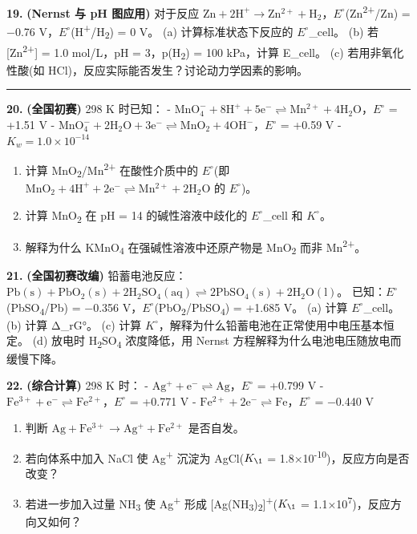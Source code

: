 \textbf{19.} \textbf{(Nernst 与 pH 图应用)} 对于反应 \(\mathrm{Zn + 2H^+ \to Zn^{2+} + H_2}\)，\(E^{\circ}\)(Zn\textsuperscript{2+}/Zn) = −0.76 V，\(E^{\circ}\)(H\textsuperscript{+}/H\textsubscript{2}) = 0 V。
(a) 计算标准状态下反应的 \(E^{\circ}\)\_cell。
(b) 若 {[}Zn\textsuperscript{2+}{]} = 1.0 mol/L，pH = 3，p(H\textsubscript{2}) = 100 kPa，计算 E\_cell。
(c) 若用非氧化性酸(如 HCl)，反应实际能否发生？讨论动力学因素的影响。

\begin{center}\rule{0.5\linewidth}{0.5pt}\end{center}

\textbf{20.} \textbf{(全国初赛)} 298 K 时已知：
- \(\mathrm{MnO_4^- + 8H^+ + 5e^- \rightleftharpoons Mn^{2+} + 4H_2O}\)，\(E^{\circ}\) = +1.51 V
- \(\mathrm{MnO_4^- + 2H_2O + 3e^- \rightleftharpoons MnO_2 + 4OH^-}\)，\(E^{\circ}\) = +0.59 V
- \(K_w = 1.0 \times 10^{-14}\)

\begin{enumerate}
\def\labelenumi{(\alph{enumi})}
\tightlist
\item
  计算 MnO\textsubscript{2}/Mn\textsuperscript{2+} 在酸性介质中的 \(E^{\circ}\)(即 \(\mathrm{MnO_2 + 4H^+ + 2e^- \rightleftharpoons Mn^{2+} + 2H_2O}\) 的 \(E^{\circ}\))。
\item
  计算 MnO\textsubscript{2} 在 pH = 14 的碱性溶液中歧化的 \(E^{\circ}\)\_cell 和 \(K^{\circ}\)。
\item
  解释为什么 KMnO\textsubscript{4} 在强碱性溶液中还原产物是 MnO\textsubscript{2} 而非 Mn\textsuperscript{2+}。
\end{enumerate}

\textbf{21.} \textbf{(全国初赛改编)} 铅蓄电池反应：\(\mathrm{Pb(s) + PbO_2(s) + 2H_2SO_4(aq) \rightleftharpoons 2PbSO_4(s) + 2H_2O(l)}\)。
已知：\(E^{\circ}\)(PbSO\textsubscript{4}/Pb) = −0.356 V，\(E^{\circ}\)(PbO\textsubscript{2}/PbSO\textsubscript{4}) = +1.685 V。
(a) 计算 \(E^{\circ}\)\_cell。
(b) 计算 Δ\_rG°。
(c) 计算 \(K^{\circ}\)，解释为什么铅蓄电池在正常使用中电压基本恒定。
(d) 放电时 H\textsubscript{2}SO\textsubscript{4} 浓度降低，用 Nernst 方程解释为什么电池电压随放电而缓慢下降。

\textbf{22.} \textbf{(综合计算)} 298 K 时：
- \(\mathrm{Ag^+ + e^- \rightleftharpoons Ag}\)，\(E^{\circ}\) = +0.799 V
- \(\mathrm{Fe^{3+} + e^- \rightleftharpoons Fe^{2+}}\)，\(E^{\circ}\) = +0.771 V
- \(\mathrm{Fe^{2+} + 2e^- \rightleftharpoons Fe}\)，\(E^{\circ}\) = −0.440 V

\begin{enumerate}
\def\labelenumi{(\alph{enumi})}
\tightlist
\item
  判断 \(\mathrm{Ag + Fe^{3+} \to Ag^+ + Fe^{2+}}\) 是否自发。
\item
  若向体系中加入 NaCl 使 Ag\textsuperscript{+} 沉淀为 AgCl(\(K_{\1}\) = 1.8×10\textsuperscript{-10})，反应方向是否改变？
\item
  若进一步加入过量 NH\textsubscript{3} 使 Ag\textsuperscript{+} 形成 {[}Ag(NH\textsubscript{3})\textsubscript{2}{]}\textsuperscript{+}(\(K_{\1}\) = 1.1×10\textsuperscript{7})，反应方向又如何？
\end{enumerate}

